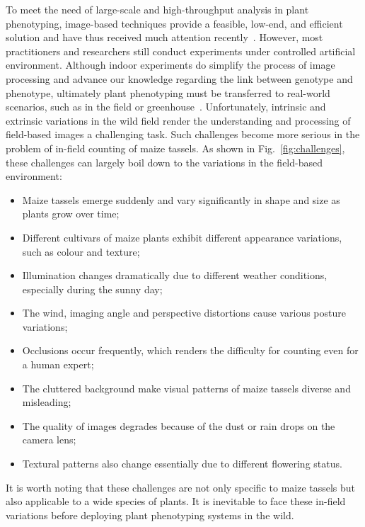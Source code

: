 \documentclass[twocolumn]{bmcart}%
\begin{document}
To meet the need of large-scale and high-throughput analysis in plant phenotyping, image-based techniques provide a feasible, low-end, and efficient solution and have thus received much attention recently~\cite{guo2015automated,lu2015fine,yang2014combining,gage2017tips}. However, most practitioners and researchers still conduct experiments under controlled artificial environment. Although indoor experiments do simplify the process of image processing and advance our knowledge regarding the link between genotype and phenotype, ultimately plant phenotyping must be transferred to real-world scenarios, such as in the field or greenhouse~\cite{fiorani2013future}. Unfortunately, intrinsic and extrinsic variations in the wild field render the understanding and processing of field-based images a challenging task. Such challenges become more serious in the problem of in-field counting of maize tassels. As shown in Fig.~\ref{fig:challenges}, these challenges can largely boil down to the variations in the field-based environment:
\begin{itemize}
	\item Maize tassels emerge suddenly and vary significantly in shape and size as plants grow over time;
	\item Different cultivars of maize plants exhibit different appearance variations, such as colour and texture;
	\item Illumination changes dramatically due to different weather conditions, especially during the sunny day;
	\item The wind, imaging angle and perspective distortions cause various posture variations;
	\item Occlusions occur frequently, which renders the difficulty for counting even for a human expert;
	\item The cluttered background make visual patterns of maize tassels diverse and misleading;
	\item The quality of images degrades because of the dust or rain drops on the camera lens;
	\item Textural patterns also change essentially due to different flowering status.
\end{itemize}
It is worth noting that these challenges are not only specific to maize tassels but also applicable to a wide species of plants. It is inevitable to face these in-field variations before deploying plant phenotyping systems in the wild.
\end{document}
